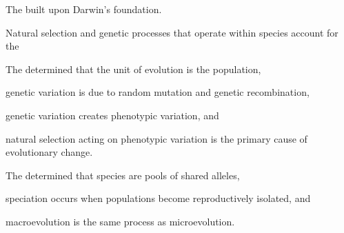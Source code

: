 \documentclass[t]{beamer}
\begin{document}
\begin{frame}{The  built upon Darwin's foundation.}

\hangpara Natural selection and genetic processes that operate within species account for the 

\end{frame}

\begin{frame}[t]{The  determined that}
\hangpara the unit of evolution is the population,

\hangpara genetic variation is due to random mutation and genetic recombination,

\hangpara genetic variation creates phenotypic variation, and

\hangpara natural selection acting on phenotypic variation is the primary cause of evolutionary change.

\end{frame}

\begin{frame}[t]{The  determined that}
\hangpara species are pools of shared alleles, 

\hangpara speciation occurs when populations become reproductively isolated, and

\hangpara macroevolution is the same process as microevolution.


\end{frame}
\end{document}
